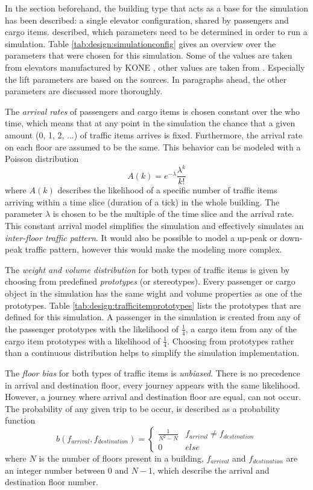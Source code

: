 In the section beforehand, the building type that acts as a base for the simulation has been described:
a single elevator configuration, shared by passengers and cargo items.
\textcite[][p.~347]{barney2016handbook} described, which parameters need to be determined in order to run a simulation. 
Table \ref{tab:design:simulationconfig} gives an overview over the parameters that were chosen for this simulation.
Some of the values are taken from elevators manufactured by KONE \autocite[][]{kone2017overview}, 
other values are taken from \textcite[][p.~349]{barney2016handbook}.
Especially the lift parameters are based on the sources.
In paragraphs ahead, the other parameters are discussed more thoroughly.

The \emph{arrival rates} of passengers and cargo items is chosen constant over the who time, 
which means that at any point in the simulation the chance that a given amount (0, 1, 2, ...) of traffic items arrives is fixed.
Furthermore, the arrival rate on each floor are assumed to be the same.
This behavior can be modeled with a Poisson distribution
$$ A(k) = e^{-\lambda}\frac{\lambda^k}{k!} $$
where $ A(k) $ describes the likelihood of a specific number of traffic items arriving within a time slice (duration of a tick) in the whole building.
The parameter $ \lambda $ is chosen to be the multiple of the time slice and the arrival rate.
This constant arrival model simplifies the simulation and effectively simulates an \emph{inter-floor traffic pattern}.
It would also be possible to model a up-peak or down-peak traffic pattern, however this would make the modeling more complex.

The \emph{weight and volume distribution} for both types of traffic items is given by choosing from predefined \emph{prototypes} (or stereotypes).
Every passenger or cargo object in the simulation has the same wight and volume properties as one of the prototypes.
Table \ref{tab:design:trafficitemprototypes} lists the prototypes that are defined for this simulation.
A passenger in the simulation is created from any of the passenger prototypes with the likelihood of $ \frac{1}{4} $, a cargo item from any of the cargo item prototypes with a likelihood of $ \frac{1}{4} $.
Choosing from prototypes rather than a continuous distribution helps to simplify the simulation implementation.

The \emph{floor bias} for both types of traffic items is \emph{unbiased}. 
There is no precedence in arrival and destination floor, every journey appears with the same likelihood.
However, a journey where arrival and destination floor are equal, can not occur.
The probability of any given trip to be occur, is described as a probability function
$$ b(f_{arrival}, f_{destination}) =
    \begin{cases} 
      \frac{1}{N^2 - N} & f_{arrival} \neq f_{destination} \\
      0 & else
   \end{cases}
$$
where $ N $ is the number of floors present in a building, $ f_{arrival} $ and  $ f_{destination} $ are an integer number between 0 and $ N - 1$, which describe the arrival and destination floor number.

